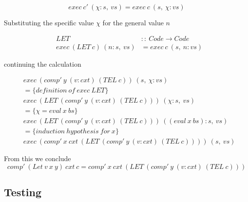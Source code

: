 \documentclass {article}
\begin{document}
\[ exec\ c'\ (\chi : s,\ vs) = exec\ c\ (s,\ \chi : vs) \]

Substituting the specific value $\chi$ for the general value $n$

\begin{eqnarray*}
 	&LET\ &::\ Code \rightarrow Code \\
 	&exec\ (LET\ c)\ (n:s,\ vs) &= exec\ c\ (s,\ n:vs)
\end{eqnarray*}

continuing the calculation

\begin{align*}
&exec\ (comp'\ y\ (v:cxt)\ (TEL\ c))\ (s,\ \chi : vs) \\
&= \{definition\ of\ exec\ LET\} \\
&exec\ (LET\ (comp'\ y\ (v:cxt)\ (TEL\ c)))\ (\chi : s,\ vs)\\
&= \{ \chi = eval\ x\ bs \} \\
&exec\ (LET\ (comp'\ y\ (v:cxt)\ (TEL\ c)))\ ((eval\ x\ bs) : s,\ vs)\\
&= \{ induction\ hypothesis\ for\ x \} \\
&exec\ (comp'\ x\ cxt\ (LET\ (comp'\ y\ (v:cxt)\ (TEL\ c))))\ (s,\ vs)
\end{align*}

From this we conclude
\[ comp'\ (Let\ v\ x\ y)\ cxt\ c
		= comp'\ x\ cxt\ (LET\ (comp'\ y\ (v:cxt)\ (TEL\ c))) \]

\subsection{Testing}












\end{document}
